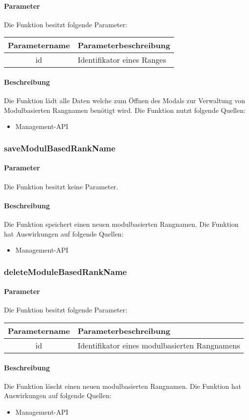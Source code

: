 \paragraph{Parameter} Die Funktion besitzt folgende Parameter:
\begin{table}[H]
	\begin{tabular}{|c|p{11cm}|}
		\hline
		\textbf{Parametername} & \textbf{Parameterbeschreibung} \\ \hline
		id & Identifikator eines Ranges \\ \hline
	\end{tabular}
\end{table}
\paragraph{Beschreibung} Die Funktion lädt alle Daten welche zum Öffnen des Modals zur Verwaltung von Modulbasierten Rangnamen benötigt wird. Die Funktion nutzt folgende Quellen:
\begin{itemize}
	\item Management-API
\end{itemize}
\subsubsection{saveModulBasedRankName}
\paragraph{Parameter} Die Funktion besitzt keine Parameter.
\paragraph{Beschreibung} Die Funktion speichert einen neuen modulbasierten Rangnamen. Die Funktion hat Auswirkungen auf folgende Quellen:
\begin{itemize}
	\item Management-API
\end{itemize}
\subsubsection{deleteModuleBasedRankName}
\paragraph{Parameter} Die Funktion besitzt folgende Parameter:
\begin{table}[H]
	\begin{tabular}{|c|p{11cm}|}
		\hline
		\textbf{Parametername} & \textbf{Parameterbeschreibung} \\ \hline
		id & Identifikator eines modulbasierten Rangnamens \\ \hline
	\end{tabular}
\end{table}
\paragraph{Beschreibung} Die Funktion löscht einen neuen modulbasierten Rangnamen. Die Funktion hat Auswirkungen auf folgende Quellen:
\begin{itemize}
	\item Management-API
\end{itemize}